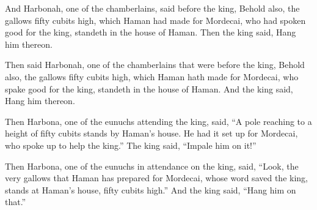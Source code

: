 			And Harbonah, one of the chamberlains, said before the king, Behold also, the gallows fifty cubits high, which Haman had made for Mordecai, who had spoken good for the king, standeth in the house of Haman. Then the king said, Hang him thereon.

			\begin{versebox}
					\item[BHS] 
					\item[LXX] 
					\item[ASV] Then said Harbonah, one of the chamberlains that were before the king, Behold also, the gallows fifty cubits high, which Haman hath made for Mordecai, who spake good for the king, standeth in the house of Haman. And the king said, Hang him thereon.
					\item[NIV] Then Harbona, one of the eunuchs attending the king, said, “A pole reaching to a height of fifty cubits stands by Haman’s house. He had it set up for Mordecai, who spoke up to help the king.” The king said, “Impale him on it!”
					\item[NRSV] Then Harbona, one of the eunuchs in attendance on the king, said, “Look, the very gallows that Haman has prepared for Mordecai, whose word saved the king, stands at Haman’s house, fifty cubits high.” And the king said, “Hang him on that.”
			\end{versebox}

